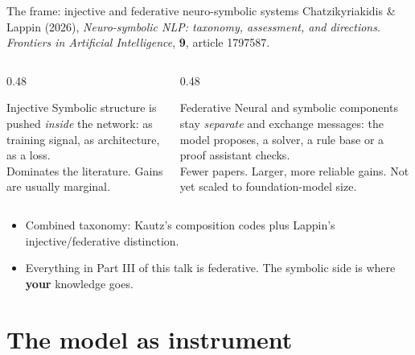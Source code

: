 \documentclass[aspectratio=169, 10pt]{beamer}
\newcommand{\key}[1]{\textcolor{aegean}{\textbf{#1}}}
\begin{document}
\begin{frame}{The frame: injective and federative neuro-symbolic systems}
  \small Chatzikyriakidis \& Lappin (2026), \emph{Neuro-symbolic NLP: taxonomy, assessment, and directions}. \emph{Frontiers in Artificial Intelligence}, \textbf{9}, article 1797587.
  \begin{columns}[T]
    \begin{column}{0.48\textwidth}
      \begin{block}{Injective}
        Symbolic structure is pushed \emph{inside} the network: as training signal, as architecture, as a loss.\\[2pt]
        Dominates the literature. Gains are usually marginal.
      \end{block}
    \end{column}
    \begin{column}{0.48\textwidth}
      \begin{block}{Federative}
        Neural and symbolic components stay \emph{separate} and exchange messages: the model proposes, a solver, a rule base or a proof assistant checks.\\[2pt]
        Fewer papers. Larger, more reliable gains. Not yet scaled to foundation-model size.
      \end{block}
    \end{column}
  \end{columns}
  \vspace{0.8em}
  \begin{itemize}
    \item Combined taxonomy: Kautz's composition codes plus Lappin's injective/federative distinction.
    \item Everything in Part III of this talk is federative. The symbolic side is where \key{your} knowledge goes.
  \end{itemize}
\end{frame}

\section{The model as instrument}
\end{document}
